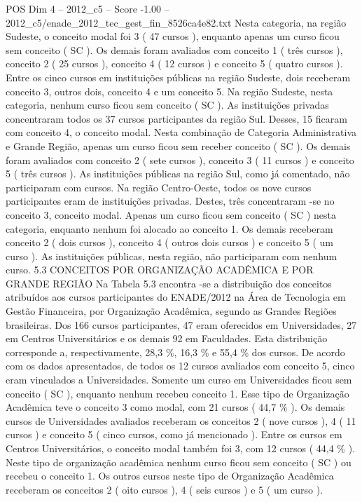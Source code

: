 \begin{textsample}{POS Dim 4 – 2012\_c5 – Score -1.00 – 2012\_c5/enade\_2012\_tec\_gest\_fin\_8526ca4e82.txt}
Nesta categoria, na região Sudeste, o conceito modal foi 3 ( 47 cursos ), enquanto apenas um curso ficou sem conceito ( SC ).
Os demais foram avaliados com conceito 1 ( três cursos ), conceito 2 ( 25 cursos ), conceito 4 ( 12 cursos ) e conceito 5 ( quatro cursos ).
Entre os cinco cursos em instituições públicas na região Sudeste, dois receberam conceito 3, outros dois, conceito 4 e um conceito 5.
Na região Sudeste, nesta categoria, nenhum curso ficou sem conceito ( SC ).
As instituições privadas concentraram todos os 37 cursos participantes da região Sul.
Desses, 15 ficaram com conceito 4, o conceito modal.
Nesta combinação de Categoria Administrativa e Grande Região, apenas um curso ficou sem receber conceito ( SC ).
Os demais foram avaliados com conceito 2 ( sete cursos ), conceito 3 ( 11 cursos ) e conceito 5 ( três cursos ).
As instituições públicas na região Sul, como já comentado, não participaram com cursos.
Na região Centro-Oeste, todos os nove cursos participantes eram de instituições privadas.
Destes, três concentraram -se no conceito 3, conceito modal.
Apenas um curso ficou sem conceito ( SC ) nesta categoria, enquanto nenhum foi alocado ao conceito 1.
Os demais receberam conceito 2 ( dois cursos ), conceito 4 ( outros dois cursos ) e conceito 5 ( um curso ).
As instituições públicas, nesta região, não participaram com nenhum curso. 5.3 CONCEITOS POR ORGANIZAÇÃO ACADÊMICA E POR GRANDE REGIÃO Na Tabela 5.3 encontra -se a distribuição dos conceitos atribuídos aos cursos participantes do ENADE/2012 na Área de Tecnologia em Gestão Financeira, por Organização Acadêmica, segundo as Grandes Regiões brasileiras.
Dos 166 cursos participantes, 47 eram oferecidos em Universidades, 27 em Centros Universitários e os demais 92 em Faculdades.
Esta distribuição corresponde a, respectivamente, 28,3 \%, 16,3 \% e 55,4 \% dos cursos.
De acordo com os dados apresentados, de todos os 12 cursos avaliados com conceito 5, cinco eram vinculados a Universidades.
Somente um curso em Universidades ficou sem conceito ( SC ), enquanto nenhum recebeu conceito 1.
Esse tipo de Organização Acadêmica teve o conceito 3 como modal, com 21 cursos ( 44,7 \% ).
Os demais cursos de Universidades avaliados receberam os conceitos 2 ( nove cursos ), 4 ( 11 cursos ) e conceito 5 ( cinco cursos, como já mencionado ).
Entre os cursos em Centros Universitários, o conceito modal também foi 3, com 12 cursos ( 44,4 \% ).
Neste tipo de organização acadêmica nenhum curso ficou sem conceito ( SC ) ou recebeu o conceito 1.
Os outros cursos neste tipo de Organização Acadêmica receberam os conceitos 2 ( oito cursos ), 4 ( seis cursos ) e 5 ( um curso ).

\end{textsample}
